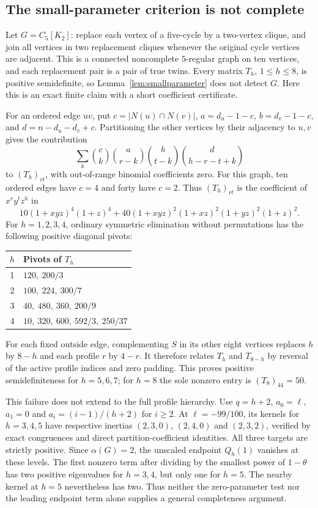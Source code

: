 \documentclass[11pt]{article}
\theoremstyle{remark}
\begin{document}
\subsection{The small-parameter criterion is not complete}
\label{ex:zerolimit}
Let $G=C_5[K_2]$: replace each vertex of a five-cycle by a two-vertex
clique, and join all vertices in two replacement cliques whenever the
original cycle vertices are adjacent. This is a connected noncomplete
$5$-regular graph on ten vertices, and each replacement pair is a pair
of true twins. Every matrix $T_h$, $1\leq h\leq8$, is positive
semidefinite, so Lemma~\ref{lem:smallparameter} does not detect $G$.
Here this is an exact finite claim with a short coefficient certificate.

For an ordered edge $uv$, put $c=|N(u)\cap N(v)|$,
$a=d_u-1-c$, $b=d_v-1-c$, and $d=n-d_u-d_v+c$.
Partitioning the other vertices by their adjacency to $u,v$ gives
the contribution
\begin{equation}
 \sum_k\binom ck\binom a{r-k}\binom b{t-k}
               \binom d{h-r-t+k}
 \label{eq:localprofile}
\end{equation}
to $(T_h)_{rt}$, with out-of-range binomial coefficients zero.
For this graph, ten ordered edges have $c=4$ and forty have $c=2$.
Thus $(T_h)_{rt}$ is the coefficient of $x^r y^t z^h$ in
\[
 10(1+xyz)^4(1+z)^4
 +40(1+xyz)^2(1+xz)^2(1+yz)^2(1+z)^2.
\]
For $h=1,2,3,4$, ordinary symmetric elimination without permutations
has the following positive diagonal pivots:
\begin{center}
\begin{tabular}{@{}cl@{}}
\toprule
$h$ & Pivots of $T_h$\\
\midrule
1 & $120,\ 200/3$\\
2 & $100,\ 224,\ 300/7$\\
3 & $40,\ 480,\ 360,\ 200/9$\\
4 & $10,\ 320,\ 600,\ 592/3,\ 250/37$\\
\bottomrule
\end{tabular}
\end{center}
For each fixed outside edge, complementing $S$ in its other eight
vertices replaces $h$ by $8-h$ and each profile $r$ by $4-r$.
It therefore relates $T_h$ and $T_{8-h}$ by reversal of the active
profile indices and zero padding. This proves positive semidefiniteness
for $h=5,6,7$;
for $h=8$ the sole nonzero entry is $(T_8)_{44}=50$.

This failure does not extend to the full profile hierarchy.
Use $q=h+2$, $a_0=\ell$, $a_1=0$ and $a_i=(i-1)/(h+2)$ for $i\geq2$.
At $\ell=-99/100$, its kernels for $h=3,4,5$ have respective inertias
$(2,3,0)$, $(2,4,0)$ and $(2,3,2)$, verified by exact congruences
and direct partition-coefficient identities. All three targets are
strictly positive. Since $\alpha(G)=2$, the unscaled endpoint $Q_h(1)$
vanishes at these levels. The first nonzero term after dividing by
the smallest power of $1-\theta$ has two positive eigenvalues for
$h=3,4$, but only one for $h=5$. The nearby kernel at $h=5$ nevertheless
has two. Thus neither the zero-parameter test nor the leading endpoint
term alone supplies a general completeness argument.
\end{document}
